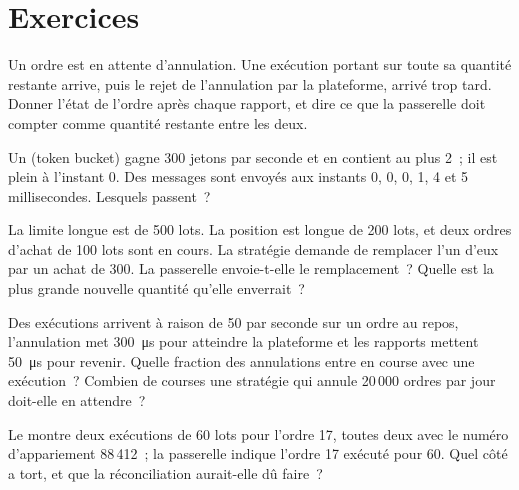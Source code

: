 \section{Exercices}

\begin{exercise}[$\star$]\label{exo:ll:order-gateway-and-order-management:1}
Un ordre est en attente d'annulation. Une exécution portant sur toute sa quantité restante arrive, puis le rejet de l'annulation
par la plateforme, arrivé trop tard. Donner l'état de l'ordre après chaque rapport, et dire ce que la passerelle doit compter comme quantité restante entre les deux.
\end{exercise}

\begin{exercise}[$\star$]\label{exo:ll:order-gateway-and-order-management:2}
Un  (token bucket) gagne 300 jetons par seconde et en contient au plus 2~; il est plein à l'instant 0. Des messages sont envoyés aux instants 0, 0, 0, 1, 4 et
5 millisecondes. Lesquels passent~?
\end{exercise}

\begin{exercise}[$\star$]\label{exo:ll:order-gateway-and-order-management:3}
La limite longue est de 500 lots. La position est longue de 200 lots, et deux ordres d'achat de 100 lots sont en cours. La stratégie
demande de remplacer l'un d'eux par un achat de 300. La passerelle envoie-t-elle le remplacement~? Quelle est la plus grande nouvelle quantité qu'elle enverrait~?
\end{exercise}

\begin{exercise}[$\star\star$]\label{exo:ll:order-gateway-and-order-management:4}
Des exécutions arrivent à raison de 50 par seconde sur un ordre au repos, l'annulation met \qty{300}{\micro\second} pour atteindre la plateforme et les rapports
mettent \qty{50}{\micro\second} pour revenir. Quelle fraction des annulations entre en course avec une exécution~? Combien de courses une stratégie qui annule
20\,000 ordres par jour doit-elle en attendre~?
\end{exercise}

\begin{exercise}[$\star\star$]\label{exo:ll:order-gateway-and-order-management:5}
Le  montre deux exécutions de 60 lots pour l'ordre 17, toutes deux avec le numéro d'appariement 88\,412~; la passerelle
indique l'ordre 17 exécuté pour 60. Quel côté a tort, et que la réconciliation aurait-elle dû faire~?
\end{exercise}

